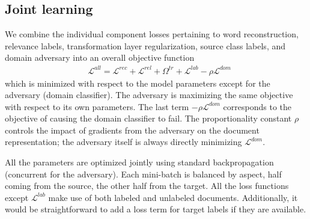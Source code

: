 \subsection{Joint learning}

We combine the individual component losses pertaining to word reconstruction, relevance labels, transformation layer regularization, source class labels, and domain adversary into an overall objective function
\begin{align}
&\mathcal{L}^{all} = 
\mathcal{L}^{rec}+\mathcal{L}^{rel}+\Omega^{tr}+\mathcal{L}^{lab}
-\rho\mathcal{L}^{dom}
\end{align}
which is minimized with respect to the model parameters except for the adversary (domain classifier). The adversary is maximizing the same objective with respect to its own parameters. The last term $-\rho\mathcal{L}^{dom}$ corresponds to the objective of causing the domain classifier to fail. The proportionality constant $\rho$ controls the impact of gradients from the adversary on the document representation; the adversary itself is always directly minimizing $\mathcal{L}^{dom}$.

All the parameters are optimized jointly using standard backpropagation (concurrent for the adversary). Each mini-batch is balanced by aspect, half coming from the source, the other half from the target. All the loss functions except $\mathcal{L}^{lab}$ make use of both labeled and unlabeled documents. Additionally, it would be straightforward to add a loss term for target labels if they are available. 

